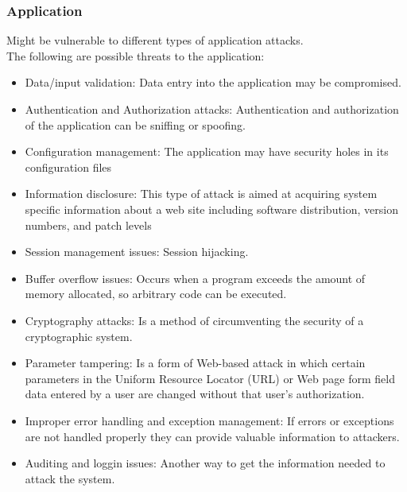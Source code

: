 \subsubsection{Application} 
Might be vulnerable to different types of application attacks.\\
The following are possible threats to the application:
\begin{itemize}
	\item Data/input validation: Data entry into the application may be compromised.
	\item Authentication and Authorization attacks: Authentication and authorization of the application can be sniffing or spoofing.
	\item Configuration management: The application may have security holes in its configuration files
	\item Information disclosure: This type of attack is aimed at acquiring system specific information about a web site including software distribution, version numbers, and patch levels
	\item Session management issues: Session hijacking.
	\item Buffer overflow issues: Occurs when a program exceeds the amount of memory allocated, so arbitrary code can be executed.
	\item Cryptography attacks: Is a method of circumventing the security of a cryptographic system.
	\item Parameter tampering: Is a form of Web-based attack in which certain parameters in the Uniform Resource Locator (URL) or Web page form field data entered by a user are changed without that user's authorization.
	\item Improper error handling and exception management: If errors or exceptions are not handled properly they can provide valuable information to attackers.
	\item Auditing and loggin issues: Another way to get the information needed to attack the system.
\end{itemize}

